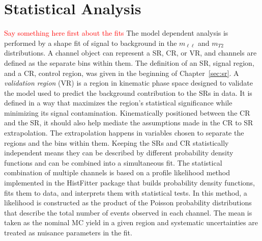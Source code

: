 \chapter{Statistical Analysis}
\label{ch:statanal}
\textcolor{red}{Say something here first about the fits} The model dependent analysis is performed by a shape fit of signal to background in the $m_{\ell\ell}$ and $m_{T2}$ distributions.  A channel object can represent a SR, CR, or VR, and channels are defined as the separate bins within them.  The definition of an SR, signal region, and a CR, control region, was given in the beginning of Chapter~\ref{sec:sr}.  A \textit{validation region} (VR) is a region in kinematic phase space designed to validate the model used to predict the background contribution to the SRs in data.  It is defined in a way that maximizes the region's statistical significance while minimizing its signal contamination.  Kinematically positioned between the CR and the SR, it should also help mediate the assumptions made in the CR to SR extrapolation.  The extrapolation happens in variables chosen to separate the regions and the bins within them.  Keeping the SRs and CR statistically independent means they can be described by different probability density functions and can be combined into a simultaneous fit. The statistical combination of multiple channels is based on a profile likelihood method implemented in the HistFitter package that builds probability density functions, fits them to data, and interprets them with statistical tests.  In this method, a likelihood is constructed as the product of the Poisson probability distributions that describe the total number of events observed in each channel.  The mean is taken as the nominal MC yield in a given region and systematic uncertainties are treated as nuisance parameters in the fit.  

\iffalse
 Channels are multi-binned distributions of $m_{\ell\ell}$ and $m_{T2}$.  A channel object can represent a CR, SR, or VR.  Samples are components of RooFit probability density functions that are decorated by HistFitter meta-data and correspond to a specific physics process.  These samples can be defined in a specific channel or simultaneously over multiple channels.  Systematic uncertainties are taken into account for each samples by providing HistFitter with a distribution representing the best possible available prediction.  \textcolor{blue}{For  each  model  component,  a  nominal  distribution  representing  the  best  available  prediction  is typically provided to the physics analysis as a histogram owned by a Sample object.  These components typically have systematic uncertainties whose impact gets quantified in dedicated studies. This is often modeled as variations of one standard deviation around the nominal prediction, provided to the physics analysis as sets of two additional histograms.  The systematic uncertainties are parameterized in the PDF as Gaussian distributed nuisance parameters.}
\fi

